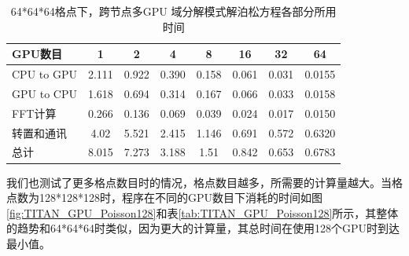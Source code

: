 \begin{table}
  \centering
  \begin{tabular}{|l|c|c|c|c|c|c|c|}
    \hline
    GPU数目	    &1	    &2	    &4	    &8 	    &16	    &32  	&64   \\
    \hline
    CPU to GPU	&2.111	&0.922	&0.390	&0.158	&0.061	&0.031	&0.0155 \\
    GPU to CPU	&1.618	&0.694	&0.314	&0.167	&0.066	&0.033	&0.0158 \\
    FFT计算  	&0.266	&0.136	&0.069	&0.039	&0.024	&0.017	&0.0150 \\
    转置和通讯	&4.02	&5.521	&2.415	&1.146	&0.691	&0.572	&0.6320 \\
    总计	    &8.015	&7.273	&3.188	&1.51	&0.842	&0.653	&0.6783 \\
    \hline
  \end{tabular}
  \caption{64*64*64格点下，跨节点多GPU 域分解模式解泊松方程各部分所用时间}
  \label{tab:TITAN_GPU_Poisson64}
\end{table}

我们也测试了更多格点数目时的情况，格点数目越多，所需要的计算量越大。当格点数为128*128*128时，程序在不同的GPU数目下消耗的时间如图\ref{fig:TITAN_GPU_Poisson128}和表\ref{tab:TITAN_GPU_Poisson128}所示，其整体的趋势和64*64*64时类似，因为更大的计算量，其总时间在使用128个GPU时到达最小值。

